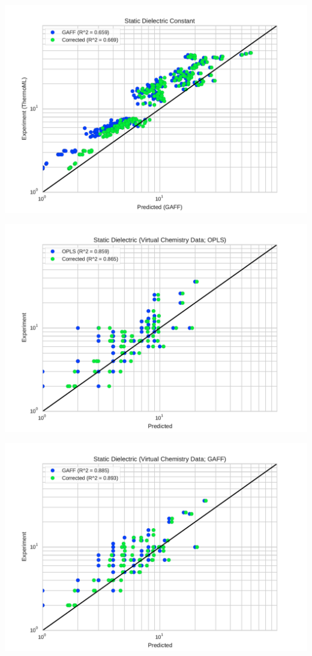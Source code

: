 \documentclass[journal=jacsat,manuscript=article]{achemso}
\begin{document}
\includegraphics[width=\columnwidth]{./figures/dielectrics_thermoml.pdf}

\includegraphics[width=\columnwidth]{./figures/dielectric_virtual_chemistry_opls.pdf}

\includegraphics[width=\columnwidth]{./figures/dielectric_virtual_chemistry_gaff.pdf}
\end{document}

